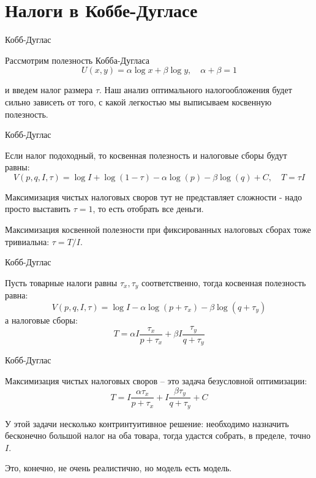 \documentclass{beamer}
\begin{document}
\section{Налоги в Коббе-Дугласе}

\begin{frame}{Кобб-Дуглас}

Рассмотрим полезность Кобба-Дугласа 
$$U(x,y) = \alpha \log x + \beta \log y, \quad \alpha + \beta = 1$$

и введем налог размера $\tau$. Наш анализ оптимального налогообложения будет сильно зависеть от того, с какой легкостью мы выписываем косвенную полезность.

\end{frame}

\begin{frame}{Кобб-Дуглас}

Если налог подоходный, то косвенная полезность и налоговые сборы будут равны:
$$ V(p,q,I,\tau) = \log I + \log (1-\tau) - \alpha \log(p) - \beta \log (q) + C, \quad T = \tau I $$

Максимизация чистых налоговых своров тут не представляет сложности - надо просто выставить $\tau = 1$, то есть отобрать все деньги. 

Максимизация косвенной полезности при фиксированных налоговых сборах тоже тривиальна: $\tau = T/I$.

\end{frame}

\begin{frame}{Кобб-Дуглас}

Пусть товарные налоги равны $\tau_x, \tau_y$ соответственно, тогда косвенная полезность равна:
$$V(p,q,I,\tau) = \log I - \alpha \log(p + \tau_x) - \beta \log (q + \tau_y)$$
а налоговые сборы:
$$T = \alpha I \frac{\tau_x}{p+\tau_x} + \beta I \frac{\tau_y}{q+\tau_y}$$

\end{frame}

\begin{frame}{Кобб-Дуглас}

Максимизация чистых налоговых своров – это задача безусловной оптимизации:
$$T =  I \frac{ \alpha\tau_x}{p+\tau_x} + I \frac{\beta \tau_y}{q+\tau_y} + C$$

У этой задачи несколько контринтуитивное решение: необходимо назначить бесконечно большой налог на оба товара, тогда удастся собрать, в пределе, точно $I$. 

Это, конечно, не очень реалистично, но модель есть модель.

\end{frame}
\end{document}
